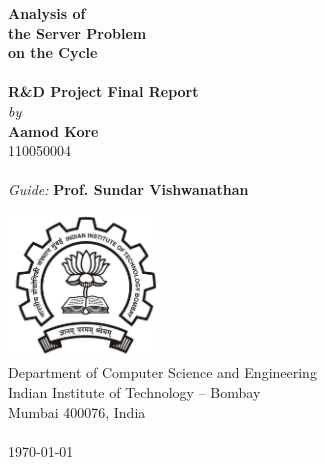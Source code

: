 \documentclass[12pt,letterpaper]{report}
\begin{document}


\begin{titlepage}
\begin{center}

{\Huge \bfseries
Analysis of \\
the Server Problem \\
on the Cycle  \\
}~\\[1.00cm]

{\large \bfseries
R\&D Project Final Report
}~\\[0.25cm]

{\large
\textit{by}
}~\\[0.25cm]

{\large
\textbf{Aamod Kore} \\
{{110050004}}\\
}~\\[0.5cm]

{\large
\textit{Guide:}
\textbf{Prof. Sundar Vishwanathan}\\
}

\vfill

\includegraphics[width=4cm]{img/iitb-logo-black.jpg}~\\[1cm]

{\large
Department of Computer Science and Engineering\\
Indian Institute of Technology -- Bombay\\
Mumbai 400076, India\\
}~\\[0.5cm]
{\large \today}
\end{center}
\end{titlepage}














{}


\end{document}
